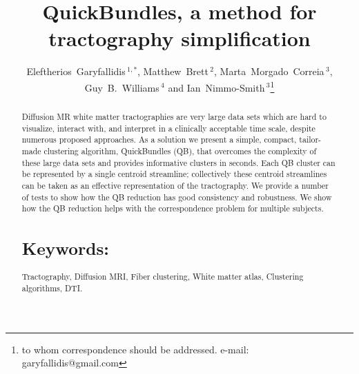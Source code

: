 \documentclass{bioinfo}
\begin{document}

\title[QuickBundles]{QuickBundles, a method for tractography simplification}

\author[Garyfallidis, Brett, Correia, Williams and
Nimmo-Smith]{Eleftherios~Garyfallidis\,$^{1,*}$, Matthew~Brett\,$^{2}$,
  Marta~Morgado~Correia\,$^{3}$, Guy~B.~Williams\,$^{4}$ and
  Ian~Nimmo-Smith\,$^{3}$\footnote{to whom correspondence should be
    addressed. e-mail: garyfallidis@gmail.com}}

\address{\,$^{1}$Wolfson College, University of Cambridge, Cambridge, UK\\
  \,$^{2}$University of California, Henry H. Wheeler, Jr. Brain Imaging Center, Berkeley, CA.\\
  \,$^{3}$MRC Cognition and Brain Sciences Unit, Cambridge, UK.\\
  \,$^{4}$Wolfson Brain Imaging Centre, University of Cambridge,
  Cambridge, UK.}


\history{}

\editor{}

\maketitle

\begin{abstract}
\noindent
Diffusion MR white matter tractographies are very large data sets which
are hard to visualize, interact with, and interpret in a clinically
acceptable time scale, despite numerous proposed approaches. As a
solution we present a simple, compact, tailor-made clustering algorithm,
QuickBundles (QB), that overcomes the complexity of these large data
sets and provides informative clusters in seconds. Each QB cluster can
be represented by a single centroid streamline; collectively these
centroid streamlines can be taken as an effective representation of the
tractography. We provide a number of tests to show how the QB reduction
has good consistency and robustness. We show how the QB reduction helps
with the correspondence problem for multiple subjects.



\section{Keywords:} Tractography, Diffusion MRI, Fiber clustering, White
matter atlas,
Clustering algorithms, DTI.

\end{abstract}
\end{document}

